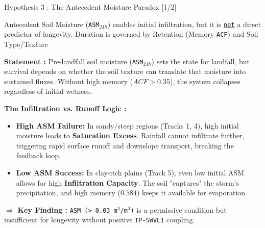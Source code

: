\begin{frame}{Hypothesis 3 : The Antecedent Moisture Paradox [1/2]}
	\begin{block}{Antecedent Soil Moisture (\texttt{ASM$_{24h}$}) enables initial infiltration, but it is \underline{\texttt{not}} a direct predictor of longevity. Duration is governed by Retention (Memory \texttt{ACF}) and Soil Type/Texture}\end{block}

	\vspace{0.15cm}
	\footnotesize
	\textbf{Statement :} Pre-landfall soil moisture (\texttt{ASM$_{24h}$}) sets the state for landfall, but survival depends on whether the soil texture can translate that moisture into sustained fluxes. Without high memory ($ACF > 0.35$), the system collapses regardless of initial wetness.

	\vspace{0.15cm}
	\footnotesize
	\textbf{The Infiltration vs. Runoff Logic :}
	\begin{itemize}
		\item \textbf{High ASM Failure:} In sandy/steep regions (Tracks 1, 4), high initial moisture leads to \textbf{Saturation Excess}. Rainfall cannot infiltrate further, triggering rapid surface runoff and downslope transport, breaking the feedback loop. \cite{kishtawal2013enhancement}
		\item \textbf{Low ASM Success:} In clay-rich plains (Track 5), even low initial ASM allows for high \textbf{Infiltration Capacity}. The soil "captures" the storm's precipitation, and high memory ($0.584$) keeps it available for evaporation.
	\end{itemize}

	\vspace{0.2cm}
	\footnotesize
	$\Rightarrow$ \textbf{Key Finding :} \texttt{ASM (> 0.03 m$^3$/m$^3$)} is a permissive condition but insufficient for longevity without positive \texttt{TP-SWVL1} coupling.


\end{frame}
